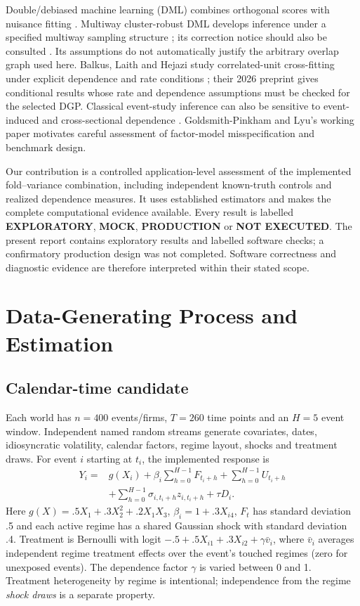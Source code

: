 \documentclass[conference]{IEEEtran}
\begin{document}
Double/debiased machine learning (DML) combines orthogonal scores with nuisance fitting \cite{dml}. Multiway cluster-robust DML develops inference under a specified multiway sampling structure \cite{multiway}; its correction notice should also be consulted \cite{correction}. Its assumptions do not automatically justify the arbitrary overlap graph used here. Balkus, Laith and Hejazi study correlated-unit cross-fitting under explicit dependence and rate conditions \cite{correlated}; their 2026 preprint gives conditional results whose rate and dependence assumptions must be checked for the selected DGP. Classical event-study inference can also be sensitive to event-induced and cross-sectional dependence \cite{kolari}. Goldsmith-Pinkham and Lyu's working paper \cite{financial} motivates careful assessment of factor-model misspecification and benchmark design.

Our contribution is a controlled application-level assessment of the implemented fold--variance combination, including independent known-truth controls and realized dependence measures. It uses established estimators and makes the complete computational evidence available. Every result is labelled \textbf{EXPLORATORY}, \textbf{MOCK}, \textbf{PRODUCTION} or \textbf{NOT EXECUTED}. The present report contains exploratory results and labelled software checks; a confirmatory production design was not completed. Software correctness and diagnostic evidence are therefore interpreted within their stated scope.

\section{Data-Generating Process and Estimation}
\subsection{Calendar-time candidate}
Each world has $n=400$ events/firms, $T=260$ time points and an $H=5$ event window. Independent named random streams generate covariates, dates, idiosyncratic volatility, calendar factors, regime layout, shocks and treatment draws. For event $i$ starting at $t_i$, the implemented response is
\begin{equation}
\begin{aligned}
Y_i={}&g(X_i)+\beta_i\sum_{h=0}^{H-1}F_{t_i+h}+\sum_{h=0}^{H-1}U_{t_i+h}\\
 &+\sum_{h=0}^{H-1}\sigma_{i,t_i+h}z_{i,t_i+h}+\tau D_i.
\end{aligned}
\end{equation}
Here $g(X)=.5X_1+.3X_2^2+.2X_1X_3$, $\beta_i=1+.3X_{i4}$, $F_t$ has standard deviation .5 and each active regime has a shared Gaussian shock with standard deviation .4. Treatment is Bernoulli with logit $-.5+.5X_{i1}+.3X_{i2}+\gamma \bar v_i$, where $\bar v_i$ averages independent regime treatment effects over the event's touched regimes (zero for unexposed events). The dependence factor $\gamma$ is varied between 0 and 1. Treatment heterogeneity by regime is intentional; independence from the regime \emph{shock draws} is a separate property.
\end{document}
